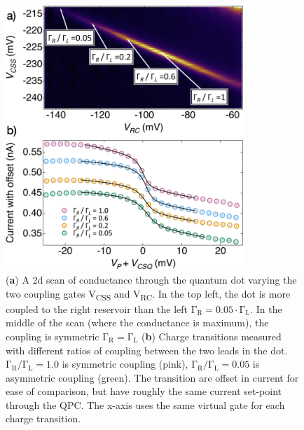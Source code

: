 \begin{figure}[!bht]
  \begin{center}
    \includegraphics[width=0.8\textwidth]{figures/ch3/crop_FiguresMaster.018.png}
    \caption[Conductance vs. Occupation : Picking locations of varying coupling symmetry]{\label{fig:ch3/symmetry_picking} 
     (\textbf{a}) A 2d scan of conductance through the quantum dot varying the two coupling gates V\textsubscript{CSS} and V\textsubscript{RC}. In the top left, the dot is more coupled to the right reservoir than the left $\mathrm{\Gamma_R} = 0.05\cdot\mathrm{\Gamma_L}$. In the middle of the scan (where the conductance is maximum), the coupling is symmetric $\mathrm{\Gamma_R} = \mathrm{\Gamma_L}$ (\textbf{b}) Charge transitions measured with different ratios of coupling between the two leads in the dot. $\mathrm{\Gamma_R/\Gamma_L} = 1.0$ is symmetric coupling (pink), $\mathrm{\Gamma_R/\Gamma_L} = 0.05$ is asymmetric coupling (green). The transition are offset in current for ease of comparison, but have roughly the same current set-point through the QPC. The x-axis uses the same virtual gate for each charge transition. 
    }
  \end{center}
\end{figure}


